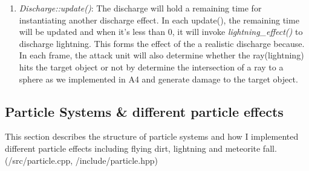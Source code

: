 \documentclass {article}
\begin{document}
\begin{enumerate}
\begin{enumerate}
        \item \textit{Discharge::update()}: The discharge will hold a remaining time for instantiating another discharge effect. In each update(), the remaining time will be updated and when it's less than 0,
        it will invoke \textit{lightning\_effect()} to discharge lightning. This forms the effect of the a realistic discharge because. In each frame, the attack unit will also determine whether the ray(lightning) hits the target object or not
        by determine the intersection of a ray to a sphere as we implemented in A4 and generate damage to the target object.
        
    \end{enumerate}
\end{enumerate}

\subsection{Particle Systems \& different particle effects}
This section describes the structure of particle systems and how I implemented different particle effects including flying dirt, lightning and meteorite fall.
(/src/particle.cpp, /include/particle.hpp)
\end{document}
